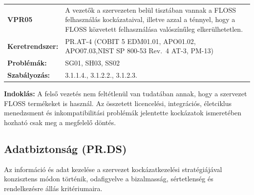\documentclass[12pt,magyar,a4paper,oneside]{scrreprt}
\begin{document}
\begin{longtable}[]{@{}ll@{}}
\toprule
\endhead
\begin{minipage}[t]{0.16\columnwidth}\raggedright
\textbf{VPR05}\strut
\end{minipage} & \begin{minipage}[t]{0.79\columnwidth}\raggedright
A vezetők a szervezeten belül tisztában vannak a FLOSS felhasználás
kockázataival, illetve azzal a ténnyel, hogy a FLOSS közvetett
felhasználása valószínűleg elkerülhetetlen.\strut
\end{minipage}\tabularnewline
\begin{minipage}[t]{0.16\columnwidth}\raggedright
\textbf{Keretrendszer:}\strut
\end{minipage} & \begin{minipage}[t]{0.79\columnwidth}\raggedright
PR.AT-4 (COBIT 5 EDM01.01, APO01.02, APO07.03,NIST SP 800-53 Rev.~4
AT-3, PM-13)\strut
\end{minipage}\tabularnewline
\begin{minipage}[t]{0.16\columnwidth}\raggedright
\textbf{Problémák:}\strut
\end{minipage} & \begin{minipage}[t]{0.79\columnwidth}\raggedright
SG01, SH03, SS02\strut
\end{minipage}\tabularnewline
\begin{minipage}[t]{0.16\columnwidth}\raggedright
\textbf{Szabályozás:}\strut
\end{minipage} & \begin{minipage}[t]{0.79\columnwidth}\raggedright
3.1.1.4., 3.1.2.2., 3.1.2.3.\strut
\end{minipage}\tabularnewline
\bottomrule
\end{longtable}

\textbf{Indoklás: } A felső vezetés nem feltétlenül van tudatában annak,
hogy a szervezet FLOSS termékeket is használ. Az összetett licencelési,
integrációs, életciklus menedzsment és inkompatibilitási problémák
jelentette kockázatok ismeretében hozható csak meg a megfelelő döntés.

\hypertarget{adatbiztonsuxe1g-pr.ds}{%
\subsection{Adatbiztonság (PR.DS)}\label{adatbiztonsuxe1g-pr.ds}}

Az információ és adat kezelése a szervezet kockázatkezelési
stratégiájával konzisztens módon történik, odafigyelve a bizalmasság,
sértetlenség és rendelkezésre állás kritériumaira.
\end{document}
